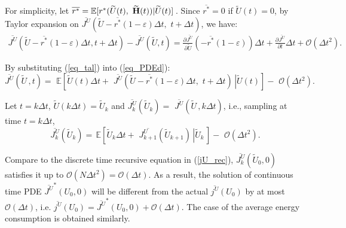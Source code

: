 \documentclass[11pt,journal, onecolumn]{./IEEEtran}
\newcommand{\red}{\color{black}}
\begin{document}
For simplicity, let $\overline {{r^*}}  = \mathbb E[{r^*}(\widetilde U(t),\,\,\widetilde {\bf H}(t))|\widetilde U(t)]\,$. Since $\overline {{r^*}}=0$ if $\widetilde U(t)=0$, by Taylor expansion on $\overline {{J^U}} (\widetilde U - \overline {{r^*}} (1 - \varepsilon )\Delta t,\,\,t + \Delta t)$, we have:
\begin{equation}\label{eq_tal}
 \begin{array}{l}
 \overline {{J^U}} (\widetilde U - \overline {{r^*}} (1 - \varepsilon )\Delta t,t + \Delta t) - \overline {{J^U}} (\widetilde U,t)= \frac{{\partial \overline {{J^U}} }}{{\partial \widetilde U}}( - \overline {{r^*}} (1 - \varepsilon ))\Delta t + \frac{{\partial \overline {{J^U}} }}{{\partial t}}\Delta t + \mathcal O(\Delta {t^2}).
 \end{array}
\end{equation}

By substituting (\ref{eq_tal}) into (\ref{eq_PDEd}):
\begin{equation}\label{eq1}
\overline {{J^U}} (\widetilde U\,,t) = \,\,\mathbb E\left[ {\widetilde U(t)\Delta t + \,\,\overline {{J^U}} (\widetilde U - \overline {{r^*}} (1 - \varepsilon )\Delta t,\,\,t + \Delta t)\,\left| {\widetilde U(t)} \right.} \right] - \,\,\mathcal O(\Delta {t^2}).
\end{equation}

{\red Let $t=k \Delta t$, $\widetilde U(k\Delta t)=\widetilde U_k$ and $\overline {J_{k}^U} ({\widetilde U_k}) = \,\,\overline {{J^U}} (\widetilde U\,,k\Delta t)$, {\red i.e., sampling at time $t=k \Delta t$},
\[\overline {J_k^U} ({\widetilde U_k}) = \,\mathbb E\left[ {{{\widetilde U}_k}\Delta t + \,\,\overline {J_{k + 1}^U} ({{\widetilde U}_{k + 1}})\,\left| {{{\widetilde U}_k}} \right.\,} \right] - \,\,\mathcal O(\Delta {t}^2).\]

{\red Compare to the discrete time recursive equation in (\ref{jU_rec}),} $\overline {J_k^U} (\widetilde U_0,0)$ satisfies it up to $\mathcal O(N\Delta t^2)=\mathcal{O}(\Delta t)$. As a result, the solution of continuous time PDE $\overline {J^U}^*(U_0,0)$ will be different from the actual $\overline{j^{U}}(U_0)$ by at most $\mathcal O(\Delta {t})$, i.e. $\overline{j^{U}}(U_0)= \overline {J^U}^*(U_0,0) + \mathcal O(\Delta t)$. The case of the average energy consumption is obtained similarly. }
\end{document}
